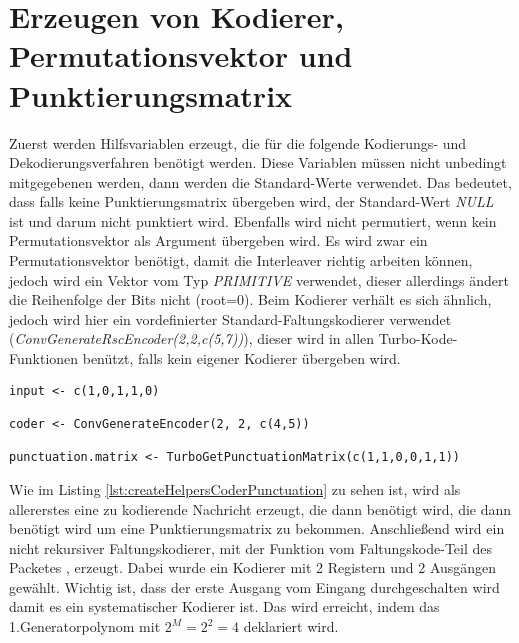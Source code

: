 \section{Erzeugen von Kodierer, Permutationsvektor und Punktierungsmatrix}
\label{sec:example_createHelpers}
Zuerst werden Hilfsvariablen erzeugt, die für die folgende Kodierungs- und Dekodierungsverfahren benötigt werden. Diese Variablen müssen nicht unbedingt mitgegebenen werden, dann werden die Standard-Werte verwendet. Das bedeutet, dass falls keine Punktierungsmatrix übergeben wird, der Standard-Wert \emph{NULL} ist und darum nicht punktiert wird. Ebenfalls wird nicht permutiert, wenn kein Permutationsvektor als Argument übergeben wird. Es wird zwar ein Permutationsvektor benötigt, damit die Interleaver richtig arbeiten können, jedoch wird ein Vektor vom Typ \emph{PRIMITIVE} verwendet, dieser allerdings ändert die Reihenfolge der Bits nicht (root=0). Beim Kodierer verhält es sich ähnlich, jedoch wird hier ein vordefinierter Standard-Faltungskodierer verwendet (\emph{ConvGenerateRscEncoder(2,2,c(5,7))}), dieser wird in allen Turbo-Kode-Funktionen benützt, falls kein eigener Kodierer übergeben wird.

\begin{lstlisting}[caption=Erzeugung von Kodierer und Punktierungsmatrix, label={lst:createHelpersCoderPunctuation}]
input <- c(1,0,1,1,0)

coder <- ConvGenerateEncoder(2, 2, c(4,5))

punctuation.matrix <- TurboGetPunctuationMatrix(c(1,1,0,0,1,1))
\end{lstlisting}

Wie im Listing \ref{lst:createHelpersCoderPunctuation} zu sehen ist, wird als allererstes eine zu kodierende Nachricht erzeugt, die dann benötigt wird, die dann benötigt wird um eine Punktierungsmatrix zu bekommen. Anschließend wird ein nicht rekursiver Faltungskodierer, mit der Funktion vom Faltungskode-Teil des Packetes \cite{nocker}, erzeugt. Dabei wurde ein Kodierer mit 2 Registern und 2 Ausgängen gewählt. Wichtig ist, dass der erste Ausgang vom Eingang durchgeschalten wird damit es ein systematischer Kodierer ist. Das wird erreicht, indem das 1.Generatorpolynom mit $2^M = 2^2 = 4$ deklariert wird.


